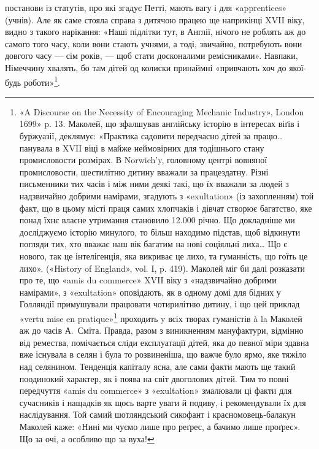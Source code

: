 \parcont{}  %
постанови із статутів, про які згадує Петті, мають вагу і для
«apprentices» (учнів). Але як саме стояла справа з дитячою працею
ще наприкінці XVII віку, видно з такого нарікання: «Наші
підлітки тут, в Англії, нічого не роблять аж до самого того часу,
коли вони стають учнями, а тоді, звичайно, потребують вони довгого
часу — сім років, — щоб стати досконалими ремісниками».
Навпаки, Німеччину хвалять, бо там дітей од колиски принаймні
«привчають хоч до якої-будь роботи»\footnote{
«A Discourse on the Necessity of Encouraging Mechanic Industry»,
London 1699» p. 13. Маколей, що зфалшував англійську історію в інтересах
віґів і буржуазії, деклямує: «Практика садовити передчасно
дітей за працю\dots{} панувала в XVII віці в майже неймовірних для тодішнього
стану промисловости розмірах. В Norwich’y, головному центрі
вовняної промисловости, шестилітню дитину вважали за працездатну.
Різні письменники тих часів і між ними деякі такі, що їх вважали за людей
з надзвичайно добрими намірами, згадують з «exultation» (із захопленням)
той факт, що в цьому місті праця самих хлопчаків і дівчат створює
багатство, яке понад їхнє власне утримання становило \num{12.000} річно. Що докладніше ми досліджуємо історію минулого, то
більш находимо підстав, щоб відкинути погляди тих, хто вважає наш
вік багатим на нові соціяльні лиха\dots{} Що є нового, так це інтелігенція,
яка викриває це лихо, та гуманність, що гоїть це лихо». («History of
England», vol. I, p. 419). Маколей міг би далі розказати про те, що «amis
du commerce» XVII віку з «надзвичайно добрими намірами», з «exultation»
оповідають, як в одному домі для бідних у Голляндії примушували
працювати чотирилітню дитину, і що цей приклад «vertu mise en pratique»\footnote*{
практичної чесноти. \emph{Ред.}
}
проходить y всіх творах гуманістів à la Маколей аж до часів
А.~Сміта. Правда, разом з виникненням мануфактури, відмінно від ремества,
помічається сліди експлуатації дітей, яка до певної міри здавна
вже існувала в селян і була то розвиненіша, що важче було ярмо,
яке тяжіло над селянином. Тенденція капіталу ясна, але сами факти
мають ще такий поодинокий характер, як і поява на світ двоголових
дітей. Тим то повні передчуття «amis du commerce» з «exultation» змалювали
ці факти для сучасників і нащадків як щось варте уваги й подиву,
і рекомендували їх для наслідування. Той самий шотляндський сикофант
і красномовець-балакун Маколей каже: «Нині ми чуємо лише про реґрес,
а бачимо лише проґрес». Що за очі, а особливо що за вуха!
}.

